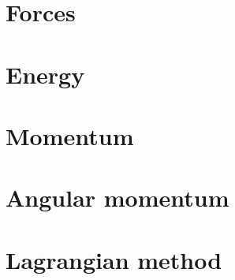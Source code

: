 \section{Forces}
\section{Energy}
\section{Momentum}
\section{Angular momentum}
\section{Lagrangian method}